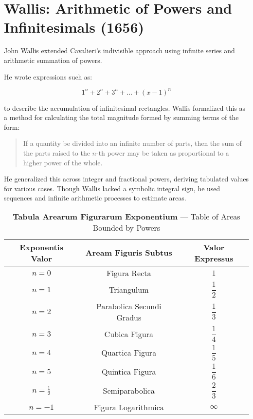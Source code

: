 \section{Wallis: Arithmetic of Powers and Infinitesimals (1656)}

John Wallis extended Cavalieri's indivisible approach using infinite series and arithmetic summation of powers.

He wrote expressions such as:

$$
1^n + 2^n + 3^n + \ldots + (x - 1)^n
$$

to describe the accumulation of infinitesimal rectangles. Wallis formalized this as a method for calculating the total magnitude formed by summing terms of the form:

\begin{quote}
If a quantity be divided into an infinite number of parts, then the sum of the parts raised to the \( n \)-th power may be taken as proportional to a higher power of the whole.
\end{quote}

He generalized this across integer and fractional powers, deriving tabulated values for various cases. Though Wallis lacked a symbolic integral sign, he used sequences and infinite arithmetic processes to estimate areas.

\vspace{1em}

\begin{table}[H]
    \centering
    \renewcommand{\arraystretch}{1.4}
    \setlength{\tabcolsep}{12pt}
    \begin{tabular}{|c|c|c|}
    \hline
    \textbf{Exponentis Valor} & \textbf{Aream Figuris Subtus} & \textbf{Valor Expressus} \\
    \hline
    $n = 0$ & Figura Recta & $1$ \\
    $n = 1$ & Triangulum & $\dfrac{1}{2}$ \\
    $n = 2$ & Parabolica Secundi Gradus & $\dfrac{1}{3}$ \\
    $n = 3$ & Cubica Figura & $\dfrac{1}{4}$ \\
    $n = 4$ & Quartica Figura & $\dfrac{1}{5}$ \\
    $n = 5$ & Quintica Figura & $\dfrac{1}{6}$ \\
    $n = \frac{1}{2}$ & Semiparabolica & $\dfrac{2}{3}$ \\
    $n = -1$ & Figura Logarithmica & $\infty$ \\
    \hline
    \end{tabular}
    \caption{\textbf{Tabula Arearum Figurarum Exponentium} — Table of Areas Bounded by Powers}
\end{table}


